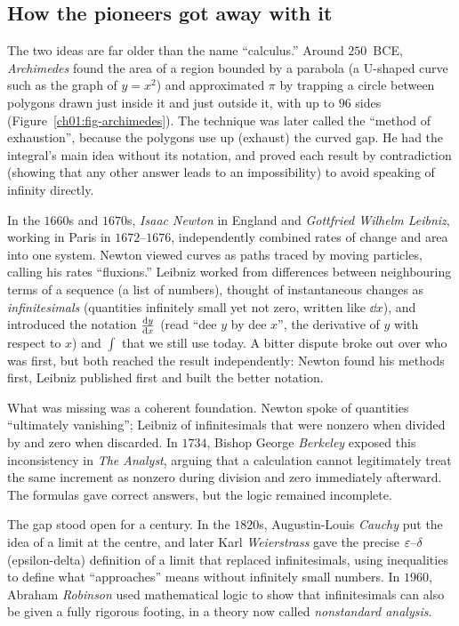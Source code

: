 \subsection{How the pioneers got away with it}

\begin{historybox}
The two ideas are far older than the name ``calculus.'' Around $250$~BCE,
\emph{Archimedes} found the area of a region bounded by a parabola (a U-shaped curve such as the graph of $y=x^2$) and approximated $\pi$ by
trapping a circle between polygons drawn just inside it and just outside it, with up to $96$ sides
(Figure~\ref{ch01:fig-archimedes}). The technique was later called the ``method of exhaustion'', because the polygons use up (exhaust) the curved gap. He had the integral's main idea without its notation,
and proved each result by contradiction (showing that any other answer leads to an impossibility) to avoid speaking of infinity directly.

In the $1660$s and $1670$s, \emph{Isaac Newton} in England and \emph{Gottfried Wilhelm
Leibniz}, working in Paris in $1672$--$1676$, independently combined rates of change and area into one
system. Newton viewed curves as paths traced by moving particles, calling his rates
``fluxions.'' Leibniz worked from differences between neighbouring terms of a sequence
(a list of numbers), thought of instantaneous changes as \emph{infinitesimals}
(quantities infinitely small yet not zero, written like $\dd x$), and introduced the
notation $\frac{\mathrm{d} y}{\mathrm{d} x}$ (read ``dee $y$ by dee $x$'', the derivative of $y$ with respect to $x$)
and $\int$ that we still use today. A bitter dispute broke out over who was
first, but both reached the result independently: Newton found his methods first,
Leibniz published first and built the better notation.

What was missing was a coherent foundation. Newton spoke of quantities ``ultimately
vanishing''; Leibniz of infinitesimals that were nonzero when divided by and zero
when discarded. In $1734$, Bishop George \emph{Berkeley} exposed this inconsistency in
\emph{The Analyst}, arguing that a calculation cannot legitimately treat the same
increment as nonzero during division and zero immediately afterward. The formulas gave
correct answers, but the logic remained incomplete.

The gap stood open for a century. In the $1820$s, Augustin-Louis \emph{Cauchy} put the idea of a limit
at the centre, and later Karl \emph{Weierstrass} gave the precise $\varepsilon$--$\delta$ (epsilon-delta)
definition of a limit that replaced infinitesimals, using inequalities to define what ``approaches'' means without
infinitely small numbers. In $1960$, Abraham \emph{Robinson} used mathematical
logic to show that infinitesimals can also be given a fully rigorous footing, in a
theory now called \emph{nonstandard analysis}.
\end{historybox}

